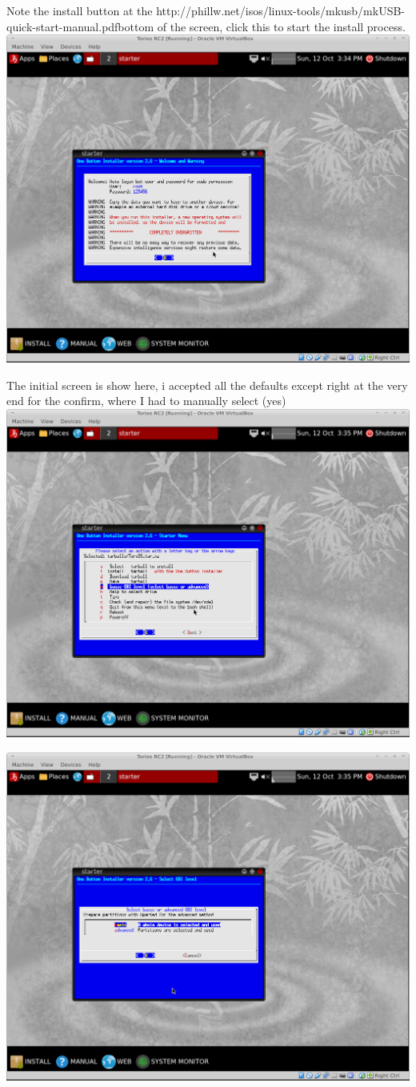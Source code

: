 \documentclass[12pt,a4paper]{book}
\begin{document}
Note the install button at the http://phillw.net/isos/linux-tools/mkusb/mkUSB-quick-start-manual.pdfbottom of the screen,  click this to start the install process. \\
\includegraphics[width=0.7\linewidth]{screen-shots/torios-rc2-install1}

The initial screen is show here,  i accepted all the defaults except right at the very end for the confirm, where I had to manually select (yes) \\

\includegraphics[width=0.7\linewidth]{screen-shots/torios-rc2-install2}

\includegraphics[width=0.7\linewidth]{screen-shots/torios-rc2-install3}
\end{document}
